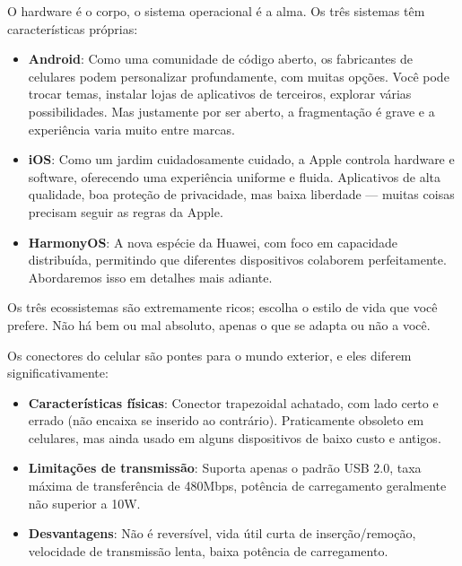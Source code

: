 
O hardware é o corpo, o sistema operacional é a alma. Os três sistemas têm características próprias:

\begin{itemize}
  \item \textbf{Android}: Como uma comunidade de código aberto, os fabricantes de celulares podem personalizar profundamente, com muitas opções. Você pode trocar temas, instalar lojas de aplicativos de terceiros, explorar várias possibilidades. Mas justamente por ser aberto, a fragmentação é grave e a experiência varia muito entre marcas.
  \item \textbf{iOS}: Como um jardim cuidadosamente cuidado, a Apple controla hardware e software, oferecendo uma experiência uniforme e fluida. Aplicativos de alta qualidade, boa proteção de privacidade, mas baixa liberdade — muitas coisas precisam seguir as regras da Apple.
  \item \textbf{HarmonyOS}: A nova espécie da Huawei, com foco em capacidade distribuída, permitindo que diferentes dispositivos colaborem perfeitamente. Abordaremos isso em detalhes mais adiante.
\end{itemize}

Os três ecossistemas são extremamente ricos; escolha o estilo de vida que você prefere. Não há bem ou mal absoluto, apenas o que se adapta ou não a você.


Os conectores do celular são pontes para o mundo exterior, e eles diferem significativamente:


\begin{itemize}
  \item \textbf{Características físicas}: Conector trapezoidal achatado, com lado certo e errado (não encaixa se inserido ao contrário). Praticamente obsoleto em celulares, mas ainda usado em alguns dispositivos de baixo custo e antigos.
  \item \textbf{Limitações de transmissão}: Suporta apenas o padrão USB 2.0, taxa máxima de transferência de 480Mbps, potência de carregamento geralmente não superior a 10W.
  \item \textbf{Desvantagens}: Não é reversível, vida útil curta de inserção/remoção, velocidade de transmissão lenta, baixa potência de carregamento.
\end{itemize}

